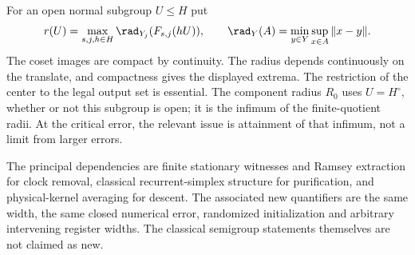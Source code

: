 For an open normal subgroup $U\le H$ put
\begin{equation}\label{eq:quotientradius55}
 r(U)=\max_{s,j,h\in H}\rad_{Y_j}(F_{s,j}(hU)),
 \qquad\rad_Y(A)=\min_{y\in Y}\sup_{x\in A}\|x-y\|.
\end{equation}
The coset images are compact by continuity. The radius depends continuously on the translate, and compactness gives the displayed extrema. The restriction of the center to the legal output set is essential. The component radius $R_0$ uses $U=H^\circ$, whether or not this subgroup is open; it is the infimum of the finite-quotient radii. At the critical error, the relevant issue is attainment of that infimum, not a limit from larger errors.


The principal dependencies are finite stationary witnesses and Ramsey
extraction for clock removal, classical recurrent-simplex structure for
purification, and physical-kernel averaging for descent. The associated
new quantifiers are the same width, the same closed numerical error,
randomized initialization and arbitrary intervening register widths.
The classical semigroup statements themselves are not claimed as new.
